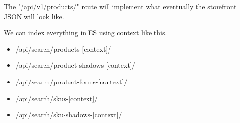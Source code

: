 \documentclass[11pt]{article}
\begin{document}
The "/api/v1/products/" route will implement what eventually the storefront JSON will look
like.

We can index everything in ES using context like this.

\begin{itemize}
    \item /api/search/products-[context]/
    \item /api/search/product-shadows-[context]/
    \item /api/search/product-forms-[context]/
    \item /api/search/skus-[context]/
    \item /api/search/sku-shadows-[context]/
\end{itemize}
\end{document}

